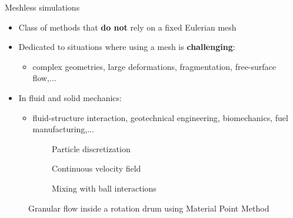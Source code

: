 \documentclass[aspectratio=169]{beamer} %
\begin{document}
\begin{frame}{Meshless simulations}
    \begin{itemize}
        \item Class of methods that \textbf{do not} rely on a fixed Eulerian mesh
        \item Dedicated to situations where using a mesh is \textbf{challenging}: \\
              \begin{itemize}
                  \item complex geometries, large deformations, fragmentation, free-surface flow,...
              \end{itemize}
        \item In fluid and solid mechanics:
              \begin{itemize}
                  \item fluid-structure interaction, geotechnical engineering, biomechanics, fuel manufacturing,...
              \end{itemize}
    \end{itemize}
    \vfill
    \begin{figure}
        \begin{subfigure}{0.32\textwidth}
            \caption*{\tiny Particle discretization}
        \end{subfigure}
        \begin{subfigure}{0.32\textwidth}
            \caption*{\tiny  Continuous velocity field}
        \end{subfigure}
        \begin{subfigure}{0.32\textwidth}
            \caption*{\tiny Mixing with ball interactions}
        \end{subfigure}
        \vspace{-0.5cm}
        \caption*{\footnotesize Granular flow inside a rotation drum using Material Point Method}
    \end{figure}
    \vspace{-0.5cm}
\end{frame}
\end{document}
